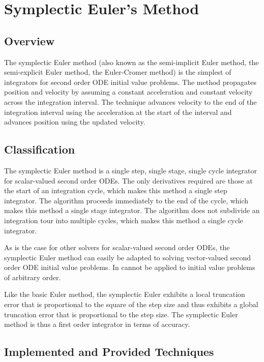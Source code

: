 \chapter{Symplectic Euler's Method}\label{app:symplectic_euler}

\section{Overview}

The symplectic Euler method (also known as the semi-implicit Euler method,
the semi-explicit Euler method, the Euler-Cromer method)
is the simplest of integrators for second order ODE initial value problems.
The method propagates position and velocity by assuming a constant acceleration
and constant velocity across the integration interval. The technique advances
velocity to the end of the integration interval using the acceleration at the
start of the interval and advances position using the updated velocity.

\section{Classification}

The symplectic Euler method is a single step, single stage, single cycle
integrator for scalar-valued second order ODEs.
The only derivatives required are those at the start of an integration cycle,
which makes this method a single step integrator. 
The algorithm proceeds immediately to the end of the cycle,
which makes this method a single stage integrator.
The algorithm does not subdivide an integration tour into multiple cycles,
which makes this method a single cycle integrator.

As is the case for other solvers for scalar-valued second order ODEs, the
symplectic Euler method can easily be adapted to solving vector-valued
second order ODE initial value problems. In cannot be applied to initial value
problems of arbitrary order.

Like the basic Euler method, the symplectic Euler exhibits a local truncation
error that is proportional to the square of the step size and thus exhibits a
global truncation error that is proportional to the step size.
The symplectic Euler method is thus a first order integrator in terms of
accuracy.

\section{Implemented and Provided Techniques}


